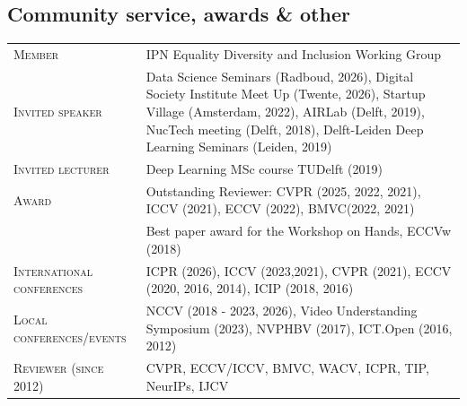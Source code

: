\documentclass[a4paper, oneside, final]{scrartcl}
\begin{document}
\begin{center}
		\section{Community service, awards \& other}
        \begin{tabular}{p{4.5cm}@{\hskip 0.3in}p{11.3cm}}
          \textsc{Member}                       & IPN Equality Diversity and Inclusion Working Group\\
          \textsc{Invited speaker}              & Data Science Seminars (Radboud,
          2026), Digital Society Institute Meet Up (Twente, 2026), Startup Village (Amsterdam, 2022), AIRLab (Delft, 2019), NucTech meeting (Delft, 2018), Delft-Leiden Deep Learning Seminars (Leiden, 2019)\\
            \textsc{Invited lecturer}           & Deep Learning MSc course TUDelft (2019)\\
            \textsc{Award}                      & Outstanding Reviewer: CVPR (2025, 2022, 2021), ICCV (2021), ECCV (2022), BMVC(2022, 2021)\\ 
                                                & Best paper award for the Workshop on Hands, ECCVw (2018)\\  
            \textsc{International conferences}  & ICPR (2026), ICCV (2023,2021), CVPR (2021), ECCV (2020, 2016, 2014), ICIP (2018, 2016)\\
            \textsc{Local conferences\slash events} &  NCCV (2018 - 2023, 2026), Video Understanding Symposium (2023), NVPHBV (2017), ICT.Open (2016, 2012)\\
            \textsc{Reviewer (since 2012)}      & CVPR, ECCV/ICCV, BMVC, WACV, ICPR, TIP, NeurIPs, IJCV\\
		\end{tabular}
		

\end{center}
\end{document}
